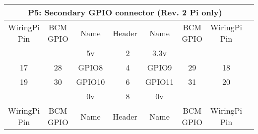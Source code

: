 \documentclass[12pt,a4paper]{article}
\begin{document}
\begin{sffamily}
\begin{center}
\begin{tabular}{|c|c|c||p{8mm}|p{8mm}||c|c|c|c|}
\hline
\multicolumn{8}{|c|}{\bfseries{P5: Secondary GPIO connector (Rev. 2 Pi only)}}\\
\hline
\hline
WiringPi Pin	& BCM GPIO	& Name	& \multicolumn{2}{|c||}{Header}	& Name	& BCM GPIO	& WiringPi Pin\\
\hline
\hline
	& 		& \textcolor{rtb-maroon}{5v}	& \raggedleft{1} &  2 & \textcolor{rtb-red}{3.3v}	& 	&	\\
\hline
17	& 28		& \textcolor{rtb-green}{GPIO8}	& \raggedleft{3} &  4 & \textcolor{rtb-green}{GPIO9}	& 29	& 18	\\
\hline
19	& 30		& \textcolor{rtb-green}{GPIO10}	& \raggedleft{5} &  6 & \textcolor{rtb-green}{GPIO11}	& 31	& 20	\\
\hline
	& 		& \textcolor{rtb-black}{0v}	& \raggedleft{7} &  8 & \textcolor{rtb-black}{0v}	& 	&	\\
\hline
\hline
WiringPi Pin	& BCM GPIO	& Name	& \multicolumn{2}{|c||}{Header}	& Name	& BCM GPIO	& WiringPi Pin\\
\hline
\end{tabular}
\end{center}


\end{sffamily}
\end{document}
